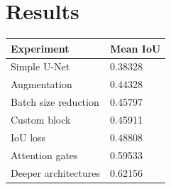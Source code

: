 \documentclass[11pt]{article}
\begin{document}
\begin{multicols}{2}


      \label{sec:results}
      \section{Results}

      \begin{table}[H]
            \label{tab:results}
            \centering
            \setlength{\tabcolsep}{3pt}
            \begin{tabularx}{\linewidth}{lY}
                \toprule
                Experiment & Mean IoU \\
                \midrule
                Simple U-Net & 0.38328 \\
                Augmentation & 0.44328 \\
                Batch size reduction & 0.45797 \\
                Custom block & 0.45911 \\
                IoU loss & 0.48808 \\
                Attention gates & 0.59533 \\
                Deeper architectures & 0.62156 \\
                \bottomrule
            \end{tabularx}
            \label{tab:results}
      \end{table}


\end{multicols}
\end{document}
